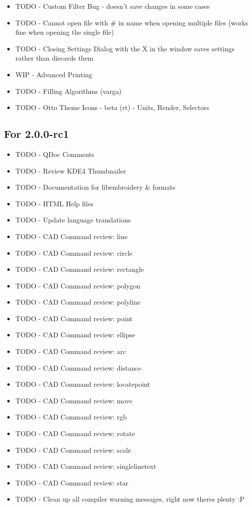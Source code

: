 \begin{itemize}
\item TODO - Custom Filter Bug - doesn't save changes in some cases
\item TODO - Cannot open file with \# in name when opening multiple files (works fine when opening the single file)
\item TODO - Closing Settings Dialog with the X in the window saves settings rather than discards them
\item WIP - Advanced Printing
\item TODO - Filling Algorithms (varga)
\item TODO - Otto Theme Icons - beta (rt) - Units, Render, Selectors
\end{itemize}

\subsection{For 2.0.0-rc1}

\begin{itemize}
\item TODO - QDoc Comments
\item TODO - Review KDE4 Thumbnailer
\item TODO - Documentation for libembroidery \& formats
\item TODO - HTML Help files
\item TODO - Update language translations
\item TODO - CAD Command review: line
\item TODO - CAD Command review: circle
\item TODO - CAD Command review: rectangle
\item TODO - CAD Command review: polygon
\item TODO - CAD Command review: polyline
\item TODO - CAD Command review: point
\item TODO - CAD Command review: ellipse
\item TODO - CAD Command review: arc
\item TODO - CAD Command review: distance
\item TODO - CAD Command review: locatepoint
\item TODO - CAD Command review: move
\item TODO - CAD Command review: rgb
\item TODO - CAD Command review: rotate
\item TODO - CAD Command review: scale
\item TODO - CAD Command review: singlelinetext
\item TODO - CAD Command review: star
\item TODO - Clean up all compiler warning messages, right now theres plenty :P
\end{itemize}

